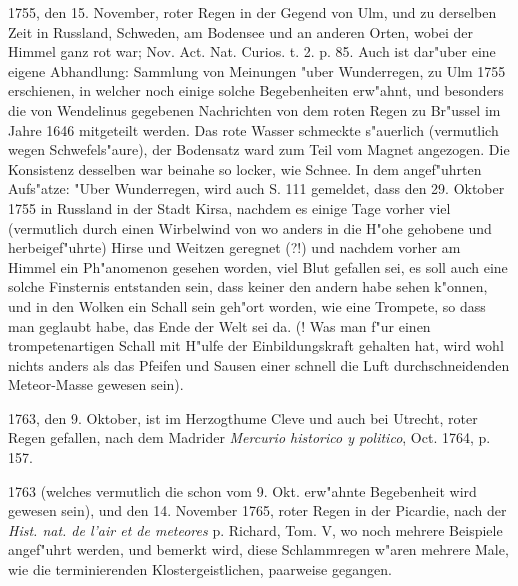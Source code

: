 \documentclass[a4paper, 11pt, oneside, polutonikogreek, german]{article}
\begin{document}
1755, den 15. November, roter Regen in der Gegend von Ulm, und zu derselben Zeit in Russland, Schweden, am Bodensee und an anderen Orten, wobei der Himmel ganz rot war; Nov. Act. Nat. Curios. t. 2. p. 85. Auch ist dar"uber eine eigene Abhandlung: Sammlung von Meinungen "uber Wunderregen, zu Ulm 1755 erschienen, in welcher noch einige solche Begebenheiten erw"ahnt, und besonders die von Wendelinus gegebenen Nachrichten von dem roten Regen zu Br"ussel im Jahre 1646 mitgeteilt werden. Das rote Wasser schmeckte s"auerlich (vermutlich wegen Schwefels"aure), der Bodensatz ward zum Teil vom Magnet angezogen. Die Konsistenz desselben war beinahe so locker, wie Schnee. In dem angef"uhrten Aufs"atze: "Uber Wunderregen, wird auch S. 111 gemeldet, dass den 29. Oktober 1755 in Russland in der Stadt Kirsa, nachdem es einige Tage vorher viel (vermutlich durch einen Wirbelwind von wo anders in die H"ohe gehobene und herbeigef"uhrte) Hirse und Weitzen geregnet (?!) und nachdem vorher am Himmel ein Ph"anomenon gesehen worden, viel Blut gefallen sei, es soll auch eine solche Finsternis entstanden sein, dass keiner den andern habe sehen k"onnen, und in den Wolken ein Schall sein geh"ort worden, wie eine Trompete, so dass man geglaubt habe, das Ende der Welt sei da. (! Was man f"ur einen trompetenartigen Schall mit H"ulfe der Einbildungskraft gehalten hat, wird wohl nichts anders als das Pfeifen und Sausen einer schnell die Luft durchschneidenden Meteor-Masse gewesen sein).

1763, den 9. Oktober, ist im Herzogthume Cleve und auch bei Utrecht, roter Regen gefallen, nach dem Madrider \emph{Mercurio historico y politico}, Oct. 1764, p. 157.

1763 (welches vermutlich die schon vom 9. Okt. erw"ahnte Begebenheit wird gewesen sein), und den 14. November 1765, roter Regen in der Picardie, nach der \emph{Hist. nat. de l'air et de meteores} p. Richard, Tom. V, wo noch mehrere Beispiele angef"uhrt werden, und bemerkt wird, diese Schlammregen w"aren mehrere Male, wie die terminierenden Klostergeistlichen, paarweise gegangen.
\end{document}
